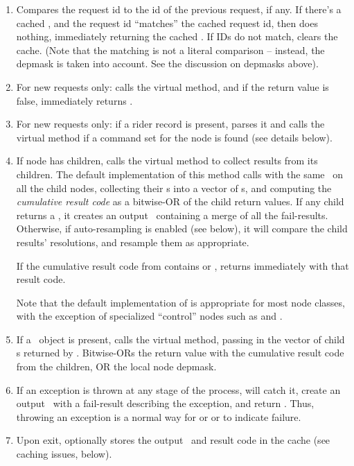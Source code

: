 \documentclass[10pt,twoside]{book}
\begin{document}
  \begin{enumerate}
  
  \item Compares the request id to the id of the previous request, if any. If
    there's a cached \Result, and the request id ``matches'' the cached request
    id, then does nothing, immediately returning the cached \Result.  If IDs do
    not match, clears the cache. (Note that the matching is not a literal
    comparison -- instead, the depmask is taken into account. See the discussion
    on depmasks above).

  \item For new requests only: calls the virtual  method,
    and if the return value is false, immediately returns .

  \item For new requests only: if a rider record is present, parses it and 
    calls the virtual  method if a command set for the
    node is found (see details below).

  \item If node has children, calls the virtual  method to
    collect results from its children. The default implementation of this
    method calls  with the same \Request\ on all the child nodes,
    collecting their \Result{}s into a vector of s, and
    computing the {\em cumulative result code} as a bitwise-OR of the child
    return values. If any child returns a , it creates an output
    \Result\ containing a merge of all the fail-results. Otherwise, if
    auto-resampling is enabled (see below), it will compare the child results'
    resolutions, and resample them as appropriate.

    If the cumulative result code from  contains 
    or ,  returns immediately with that result code.  

    Note that the default implementation of  is appropriate
    for most node classes, with the exception of specialized ``control'' nodes
    such as  and .

  \item If a \Cells\ object is present, calls the virtual 
    method, passing in the vector of child \Result{}s returned by
    . Bitwise-ORs the return value with the cumulative
    result code from the children, OR the local node depmask.

  \item If an exception is thrown at any stage of the process, 
    will catch it, create an output \Result\ with a fail-result describing the
    exception, and return . Thus, throwing an exception is a normal
    way for  or  or  to
    indicate failure.

  \item Upon exit, optionally stores the output \Result\ and result code in the
    cache (see caching issues, below).

  \end{enumerate}
\end{document}
